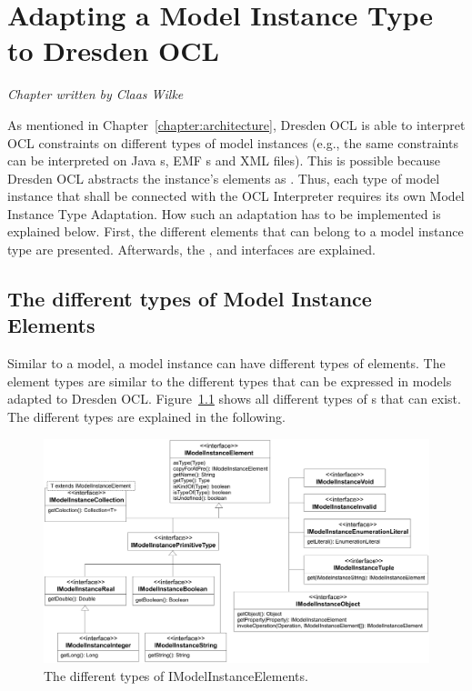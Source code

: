\chapter{Adapting a Model Instance Type to Dresden OCL}
\label{chapter:modelInstanceTypeAdaptation}

\begin{flushright}
\textit{Chapter written by Claas Wilke}
\end{flushright}

As mentioned in Chapter~\ref{chapter:architecture}, Dresden OCL is able to
interpret \acs{OCL} constraints on different types of model instances (e.g., 
the same constraints can be interpreted on Java s, \acs{EMF}
s and \acs{XML} files). This is possible because Dresden OCL
abstracts the instance's elements as . Thus, each
type of model instance that shall be connected with the \acs{OCL} Interpreter 
requires its own Model Instance Type Adaptation. How such an adaptation has to
be implemented is explained below. First, the different elements that can 
belong to a model instance type are presented. Afterwards, the
,  and 
 interfaces are explained.


\section{The different types of Model Instance Elements}

Similar to a model, a model instance can have different types of elements. The
element types are similar to the different types that can be expressed in 
models adapted to Dresden OCL. 
Figure~\ref{pic:modelInstanceTypeAdaptation:typeHierarchy} shows all different 
types of s that can exist. The different types are
explained in the following.

\begin{figure}
	\centering
	\includegraphics[width=1.0\linewidth]{figures/modelInstanceTypeAdaptation/typeHierarchy}
	\caption{The different types of IModelInstanceElements.}
	\label{pic:modelInstanceTypeAdaptation:typeHierarchy}
\end{figure}


